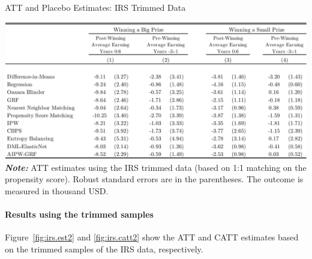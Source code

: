 \documentclass[letterpaper,12pt,leqno]{article}
\begin{document}
\begin{table}[!ht]
\caption{ATT and Placebo Estimates: IRS Trimmed Data}\label{tb:irs.est}
\begin{minipage}[c]{1\textwidth}
\vspace{-0.5em}\includegraphics[width=\linewidth]{irs_trimmed.pdf}
{\footnotesize\textbf{\textit{Note:}} ATT estimates using the IRS trimmed data (based on 1:1 matching on the propensity score). Robust standard errors are in the parentheses. The outcome is measured in thousand USD.}
\end{minipage}%
\end{table}

\clearpage

\paragraph{Results using the trimmed samples} Figure~\ref{fig:irs.est2} and \ref{fig:irs.catt2} show the ATT and CATT estimates based on the trimmed samples of the IRS data, respectively. 
\end{document}
